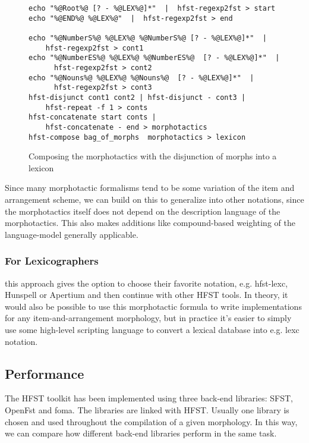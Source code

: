 \documentclass{llncs}
\begin{document}
\begin{figure} [h!]
{\footnotesize
\begin{verbatim}
echo "%@Root%@ [? - %@LEX%@]*"  |  hfst-regexp2fst > start
echo "%@END%@ %@LEX%@"  |  hfst-regexp2fst > end

echo "%@NumberS%@ %@LEX%@ %@NumberS%@ [? - %@LEX%@]*"  |
    hfst-regexp2fst > cont1
echo "%@NumberES%@ %@LEX%@ %@NumberES%@  [? - %@LEX%@]*"  |
      hfst-regexp2fst > cont2
echo "%@Nouns%@ %@LEX%@ %@Nouns%@  [? - %@LEX%@]*"  |
      hfst-regexp2fst > cont3
hfst-disjunct cont1 cont2 | hfst-disjunct - cont3 |
    hfst-repeat -f 1 > conts
hfst-concatenate start conts |
    hfst-concatenate - end > morphotactics
hfst-compose bag_of_morphs  morphotactics > lexicon
\end{verbatim}
}
\caption{Composing the morphotactics with the disjunction of morphs into a lexicon}
\label{fig:morphology2}
\end{figure}

Since many morphotactic formalisms tend to be some variation of the item and arrangement scheme,
we can build on this to generalize into other notations, since the morphotactics itself
does not depend on the description language of the morphotactics. 
This also makes additions like compound-based weighting of the language-model 
\cite{linden/2009/fsmnlp} generally applicable.

\subsubsection{For Lexicographers} this approach gives the option to
choose their favorite notation, e.g. hfst-lexc, Hunspell or Apertium and then continue with other
HFST tools. In theory, it would also be possible to use this morphotactic formula
to write implementations for any item-and-arrangement morphology, but in practice
it's easier to simply use some high-level scripting language to convert a lexical database into 
e.g. lexc notation.

\subsection{Performance}

The HFST toolkit has been implemented using three back-end libraries:
SFST, OpenFst and foma. The libraries are linked with HFST. Usually one library is chosen
and used throughout the compilation of a given morphology.
In this way, we can compare how different back-end libraries perform
in the same task.
\end{document}
